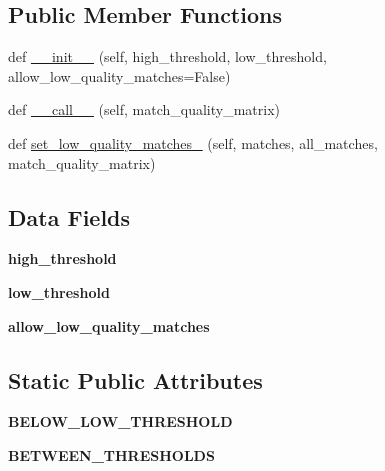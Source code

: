 \subsection*{Public Member Functions}
\begin{DoxyCompactItemize}
\item 
def \hyperlink{classtorchvision_1_1models_1_1detection_1_1__utils_1_1Matcher_a6f253e10991f96bdb9dadcb0bdb9ff4d}{\+\_\+\+\_\+init\+\_\+\+\_\+} (self, high\+\_\+threshold, low\+\_\+threshold, allow\+\_\+low\+\_\+quality\+\_\+matches=False)
\item 
def \hyperlink{classtorchvision_1_1models_1_1detection_1_1__utils_1_1Matcher_ae4210fa2c8d4723d8749bf30ab5bb1b7}{\+\_\+\+\_\+call\+\_\+\+\_\+} (self, match\+\_\+quality\+\_\+matrix)
\item 
def \hyperlink{classtorchvision_1_1models_1_1detection_1_1__utils_1_1Matcher_aa99b84bf2c4673c06a5674f75cf8a2e7}{set\+\_\+low\+\_\+quality\+\_\+matches\+\_\+} (self, matches, all\+\_\+matches, match\+\_\+quality\+\_\+matrix)
\end{DoxyCompactItemize}
\subsection*{Data Fields}
\begin{DoxyCompactItemize}
\item 
\mbox{\label{classtorchvision_1_1models_1_1detection_1_1__utils_1_1Matcher_abb1cefed6ff48f368a9d9aa3fa2c30cd}} 
{\bfseries high\+\_\+threshold}
\item 
\mbox{\label{classtorchvision_1_1models_1_1detection_1_1__utils_1_1Matcher_af5862e1fa42f3bae2058d45963f419f2}} 
{\bfseries low\+\_\+threshold}
\item 
\mbox{\label{classtorchvision_1_1models_1_1detection_1_1__utils_1_1Matcher_a4ab7edd71ffb82696e0f0be4e68bb95b}} 
{\bfseries allow\+\_\+low\+\_\+quality\+\_\+matches}
\end{DoxyCompactItemize}
\subsection*{Static Public Attributes}
\begin{DoxyCompactItemize}
\item 
\mbox{\label{classtorchvision_1_1models_1_1detection_1_1__utils_1_1Matcher_ab2c51e364e671b445b9930c1bc09fdf7}} 
{\bfseries B\+E\+L\+O\+W\+\_\+\+L\+O\+W\+\_\+\+T\+H\+R\+E\+S\+H\+O\+LD}
\item 
\mbox{\label{classtorchvision_1_1models_1_1detection_1_1__utils_1_1Matcher_a76589322a38c91b6417a6392305ec69c}} 
{\bfseries B\+E\+T\+W\+E\+E\+N\+\_\+\+T\+H\+R\+E\+S\+H\+O\+L\+DS}
\end{DoxyCompactItemize}


